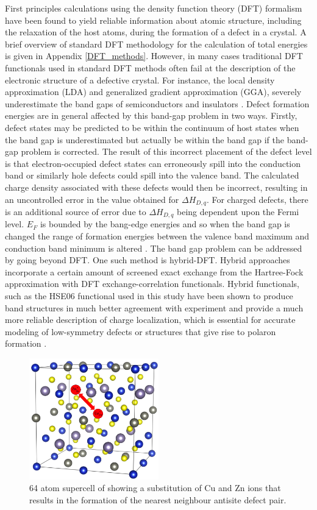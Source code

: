 First principles calculations using the density function theory (DFT) formalism have been found to yield reliable information about atomic structure, including the relaxation of the host atoms, during the formation of a defect in a crystal. A brief overview of standard DFT methodology for the calculation of total energies is given in Appendix \ref{DFT_methods}. However, in many cases traditional DFT functionals used in standard DFT methods often fail at the description of the electronic structure of a defective crystal. For instance, the local density approximation (LDA) and generalized gradient approximation (GGA), severely underestimate the band gaps of semiconductors and insulators \cite{defects_tutorial}.
Defect formation energies are in general affected by this band-gap problem in two ways. Firstly, defect states may be predicted to be within the continuum of host states when the band gap is underestimated but actually be within the band gap if the band-gap problem is corrected. The result of this incorrect placement of the defect level is that electron-occupied defect states can erroneously spill into the conduction band or similarly hole defects could spill into the valence band. The calculated charge density associated with these defects would then be incorrect, resulting in an uncontrolled error in the value obtained for $\Delta H_{D,q}$. For charged defects, there is an additional source of error due to $\Delta H_{D,q}$ being dependent upon the Fermi level. $E_F$ is bounded by the bang-edge energies and so when the band gap is changed the range of formation energies between the valence band maximum and conduction band minimum is altered \cite{defects_Lany}.
The band gap problem can be addressed by going beyond DFT. One such method is hybrid-DFT. Hybrid approaches incorporate a certain amount of screened exact exchange from the Hartree-Fock approximation with DFT exchange-correlation functionals. Hybrid functionals, such as the HSE06 functional \cite{HSE} used in this study have been shown to produce band structures in much better agreement with experiment and provide a much more reliable description of charge localization, which is essential for accurate modeling of low-symmetry defects or structures that give rise to polaron formation \cite{defects_tutorial}.

\begin{figure}[h!]
  \centering
    \includegraphics[width=0.5\textwidth]{figures/Cu-Zn_defect.png}
    \caption{64 atom supercell of {\CZTS} showing a substitution of Cu and Zn ions that results in the formation of the nearest neighbour antisite defect pair.}
  \label{Cu-Zn_defect}
\end{figure}

